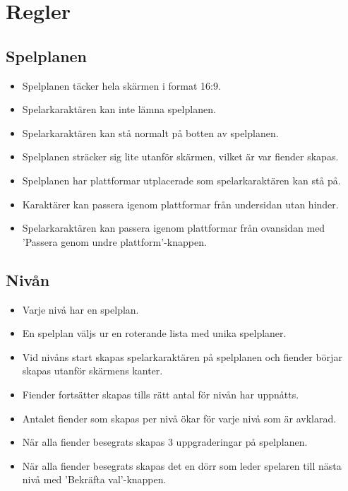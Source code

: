 \documentclass{TDP005mall}
\begin{document}
\section{Regler}
\subsection{Spelplanen}
\begin{itemize}
\item Spelplanen täcker hela skärmen i format 16:9.
\item Spelarkaraktären kan inte lämna spelplanen.
\item Spelarkaraktären kan stå normalt på botten av spelplanen.
\item Spelplanen sträcker sig lite utanför skärmen, vilket är var fiender skapas.
\item Spelplanen har plattformar utplacerade som spelarkaraktären kan stå på.
\item Karaktärer kan passera igenom plattformar från undersidan utan hinder.
\item Spelarkaraktären kan passera igenom plattformar från ovansidan med 'Passera genom undre plattform'-knappen.
\end{itemize}

\subsection{Nivån}
\begin{itemize}
\item Varje nivå har en spelplan.
\item En spelplan väljs ur en roterande lista med unika spelplaner.
\item Vid nivåns start skapas spelarkaraktären på spelplanen och fiender börjar skapas utanför skärmens kanter.
\item Fiender fortsätter skapas tills rätt antal för nivån har uppnåtts.
\item Antalet fiender som skapas per nivå ökar för varje nivå som är avklarad.
\item När alla fiender besegrats skapas 3 uppgraderingar på spelplanen.
\item När alla fiender besegrats skapas det en dörr som leder spelaren till nästa nivå med 'Bekräfta val'-knappen.
\end{itemize}
\end{document}
